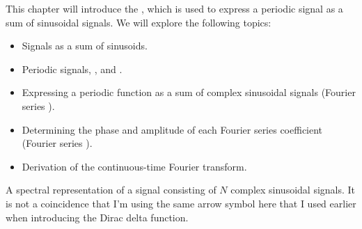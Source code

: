 This chapter will introduce the \emph{}, which is used to express a periodic signal as a sum of sinusoidal signals. 
We will explore the following topics:
\begin{itemize}
\item Signals as a sum of sinusoids.
\item Periodic signals, \emph{}, and \emph{}.
\item Expressing a periodic function as a sum of complex sinusoidal signals (Fourier series ).
\item Determining the phase and amplitude of each Fourier series coefficient (Fourier series ).
\item Derivation of the continuous-time Fourier transform.
\end{itemize}

\begin{marginfigure}
\begin{center}
\end{center}
\caption{A spectral representation of a signal consisting of $N$ complex sinusoidal signals. It is not a coincidence that I'm using the same arrow symbol here that I used earlier when introducing the Dirac delta function.}
\label{fig:spec_rep}
\end{marginfigure}


